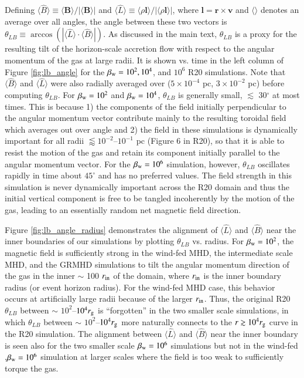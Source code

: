 \documentclass[twocolumn,twocolappendix,apjl,appendixfloats]{aastex63}
\begin{document}
Defining $\langle \hat B\rangle  \equiv \langle \mathbf{ B} \rangle/|\langle\mathbf{B}\rangle|$ and $\langle \hat L \rangle \equiv \langle \rho \mathbf{l}\rangle/|\langle \rho \mathbf{l}\rangle|$, where $\mathbf{l} = \mathbf{r} \times \mathbf{v}$ and $\langle \rangle$ denotes an average over all angles, the angle between these two vectors is $\theta_{LB} \equiv \arccos \left(\left|\langle \hat L \rangle \cdot \langle \hat B \rangle\right|\right)$.  As discussed in the main text, $\theta_{LB}$ is a proxy for the resulting tilt of the horizon-scale accretion flow with respect to the angular momentum of the gas at large radii.  It is shown vs. time in the left column of Figure \ref{fig:lb_angle} for the $\beta_{\rm w} = 10^2,10^4$, and $10^6$ R20 simulations.  Note that $\langle \hat B \rangle$ and $\langle \hat L \rangle$ were also radially averaged over ($5 \times 10^{−4}$ pc, $3 \times 10^{-2}$ pc) before computing $\theta_{LB}$.  
For $\beta_{\rm w} = 10^{2}$ and $\beta_{\rm w}=10^4$, $\theta_{LB}$ is generally small, $\lesssim$ 30$^\circ$ at most times.  This is because 1) the components of the field initially perpendicular to the angular momentum vector contribute mainly to the resulting toroidal field which averages out over angle and 2) the field in these simulations is dynamically important for all radii $\lessapprox 10^{-2}$--$10^{-1}$ pc (Figure 6 in R20), so that it is able to resist the motion of the gas and retain its component initially parallel to the angular momentum vector.      For the $\beta_{\rm w}=10^6$ simulation, however, $\theta_{LB}$ oscillates rapidly in time about $45^\circ$ and has no preferred values.  The field strength in this simulation is never dynamically important across the R20 domain and thus the initial vertical component is free to be tangled incoherently by the motion of the gas, leading to an essentially random net magnetic field direction.  

Figure \ref{fig:lb_angle_radius} demonstrates the alignment of $\langle \hat L \rangle$ and $\langle \hat B \rangle$ near the inner boundaries of our simulations by plotting $\theta_{LB}$ vs. radius.  For $\beta_{\rm w} = 10^2$, the magnetic field is sufficiently strong in the wind-fed MHD, the intermediate scale MHD, and the GRMHD simulations to tilt the angular momentum direction of the gas in the inner $\sim$ 100 $r_{\rm in }$ of the domain, where $r_{\rm in}$ is the inner boundary radius (or event horizon radius).   For the wind-fed MHD case, this behavior occurs at artificially large radii because of the larger $r_{\rm in}$.   Thus, the original R20 $\theta_{LB}$ between $\sim$ $10^2$--$10^4 r_{\rm g}$ is ``forgotten'' in the two smaller scale simulations, in which $\theta_{LB}$ between $\sim$ $10^2$--$10^4 r_{\rm g}$  more naturally connects to the $r \gtrsim 10^4 r_{\rm g}$ curve in the R20 simulation.  The alignment between $\langle \hat L \rangle$ and $\langle \hat B \rangle$ near the inner boundary is seen also for the two smaller scale $\beta_{\rm w}=10^6$ simulations but not in the wind-fed ,$\beta_{\rm w}=10^6$ simulation at larger scales where the field is too weak to sufficiently torque the gas.  
\end{document}
